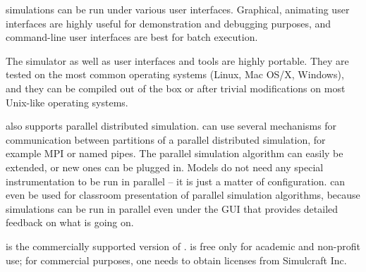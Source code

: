 {\opp} simulations can be run under various user interfaces.
Graphical, animating user interfaces are highly useful for
demonstration and debugging purposes, and command-line user
interfaces are best for batch execution.

The simulator as well as user interfaces and tools are highly portable.
They are tested on the most common operating systems (Linux, Mac OS/X,
Windows), and they can be compiled out of the box or after trivial
modifications on most Unix-like operating systems.

{\opp} also supports parallel distributed simulation. {\opp} can
use several mechanisms for communication between partitions of
a parallel distributed simulation, for example MPI or named pipes.
The parallel simulation algorithm can easily be extended, or new
ones can be plugged in. Models do not need any special instrumentation
to be run in parallel -- it is just a matter of configuration.
{\opp} can even be used for classroom presentation of parallel
simulation algorithms, because simulations can be run in parallel
even under the GUI that provides detailed feedback on what is going on.

{\omnest} is the commercially supported version of {\omnetpp}.
{\omnetpp} is free only for academic and non-profit use;
for commercial purposes, one needs to obtain {\omnest} licenses
from Simulcraft Inc.


